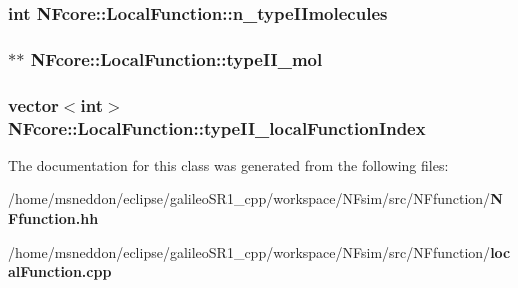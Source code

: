\subsubsection{\setlength{\rightskip}{0pt plus 5cm}int {\bf NFcore::LocalFunction::n\_\-typeIImolecules}\hspace{0.3cm}{\tt  [protected]}}\label{classNFcore_1_1LocalFunction_02acb589165bf598387771403bd78e04}


\subsubsection{$\ast$$\ast$ {\bf NFcore::LocalFunction::typeII\_\-mol}\hspace{0.3cm}{\tt  [protected]}}\label{classNFcore_1_1LocalFunction_18a40f1cc4dba13502a542c60aa3961d}


\subsubsection{\setlength{\rightskip}{0pt plus 5cm}vector$<$int$>$ {\bf NFcore::LocalFunction::typeII\_\-localFunctionIndex}\hspace{0.3cm}{\tt  [protected]}}\label{classNFcore_1_1LocalFunction_90a0774ef85096dbdd99ccabcc045553}




The documentation for this class was generated from the following files:\begin{CompactItemize}
\item 
/home/msneddon/eclipse/galileoSR1\_\-cpp/workspace/NFsim/src/NFfunction/{\bf NFfunction.hh}\item 
/home/msneddon/eclipse/galileoSR1\_\-cpp/workspace/NFsim/src/NFfunction/{\bf localFunction.cpp}\end{CompactItemize}

